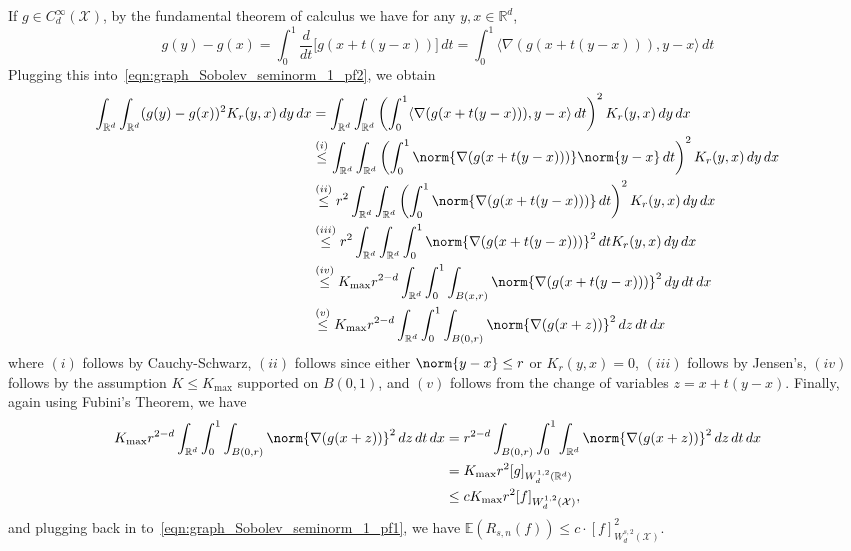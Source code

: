 \documentclass{article}
\newcommand{\Reals}{\mathbb{R}}
\newcommand{\1}{\mathbf{1}}
\newcommand{\Rd}{\Reals^d}
\newcommand{\Xset}{\mathcal{X}}
\newcommand{\Ebb}{\mathbb{E}}
\newcommand{\dotp}[2]{\langle #1, #2 \rangle}
\theoremstyle{alden}
\theoremstyle{aldenthm}
\theoremstyle{definition}
\theoremstyle{remark}
\begin{document}
If $g \in C_d^{\infty}(\Xset)$, by the fundamental theorem of calculus we have for any $y,x \in \Rd$,
\begin{equation*}
g(y) - g(x) = \int_{0}^{1} \frac{d}{dt}\bigl[g(x + t(y - x))\bigr] \,dt = \int_{0}^{1} \dotp{\nabla(g(x + t(y - x)))}{y - x} \,dt
\end{equation*}
Plugging this into~\eqref{eqn:graph_Sobolev_seminorm_1_pf2}, we obtain
\begin{align*}
\int_{\Rd} \int_{\Rd} (g(y) - g(x))^2 K_r(y,x) \,dy \,dx & = \int_{\Rd} \int_{\Rd} \left(\int_{0}^{1} \dotp{\nabla(g(x + t(y - x)))}{y - x} \,dt\right)^2 K_r(y,x) \,dy \,dx \\
& \overset{(i)}{\leq} \int_{\Rd} \int_{\Rd} \left(\int_{0}^{1} \norm{\nabla(g(x + t(y - x)))}\norm{y - x} \,dt\right)^2 K_r(y,x) \,dy \,dx \\
& \overset{(ii)}{\leq} r^2\int_{\Rd} \int_{\Rd} \left(\int_{0}^{1} \norm{\nabla(g(x + t(y - x)))}\,dt\right)^2 K_r(y,x) \,dy \,dx \\
& \overset{(iii)}{\leq} r^2\int_{\Rd} \int_{\Rd} \int_{0}^{1} \norm{\nabla(g(x + t(y - x)))}^2 \,dt K_r(y,x) \,dy \,dx \\
& \overset{(iv)}{\leq} K_{\max} r^{2 - d}\int_{\Rd} \int_{0}^{1} \int_{B(x,r)} \norm{\nabla(g(x + t(y - x)))}^2 \,dy \,dt \,dx \\
& \overset{(v)}{\leq} K_{\max} r^{2 - d}\int_{\Rd} \int_{0}^{1} \int_{B(0,r)} \norm{\nabla(g(x + z))}^2  \,dz \,dt \,dx
\end{align*}
where $(i)$ follows by Cauchy-Schwarz, $(ii)$ follows since either $\norm{y - x} \leq r$ or $K_r(y,x) = 0$, $(iii)$ follows by Jensen's, $(iv)$ follows by the assumption $K \leq K_{\max}$ supported on $B(0,1)$, and $(v)$ follows from the change of variables $z = x + t(y - x)$. Finally, again using Fubini's Theorem, we have
\begin{align*}
K_{\max} r^{2 - d}\int_{\Rd} \int_{0}^{1} \int_{B(0,r)} \norm{\nabla(g(x + z))}^2  \,dz \,dt \,dx & = r^{2 - d}\int_{B(0,r)} \int_{0}^{1} \int_{\Rd} \norm{\nabla(g(x + z))}^2  \,dz \,dt \,dx \\
& = K_{\max} r^2 [g]_{W_d^{1,2}(\Rd)} \\
& \leq c K_{\max} r^2 [f]_{W_d^{1,2}(\Xset)},
\end{align*}
and plugging back in to~\eqref{eqn:graph_Sobolev_seminorm_1_pf1}, we have $\Ebb(R_{s,n}(f)) \leq  c \cdot [f]_{W_d^{s,2}(\mathcal{X})}^2$.
\end{document}
